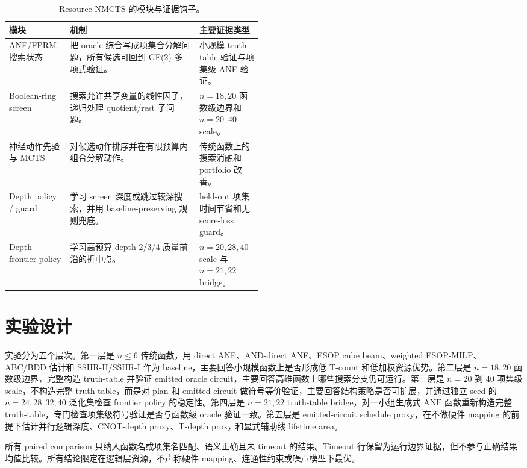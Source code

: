 \documentclass[UTF8,fontset=macnew,11pt]{ctexart}
\newcommand{\method}{Resource-NMCTS}
\newcommand{\anf}{\ensuremath{\mathrm{ANF}}}
\newcommand{\mcts}{\ensuremath{\mathrm{MCTS}}}
\newcommand{\ttable}{truth-table}
\begin{document}
\begin{table}[H]
\centering
\small
\caption{\method{} 的模块与证据钩子。}
\label{tab:modules}
\begin{tabularx}{\linewidth}{>{\raggedright\arraybackslash}p{0.24\linewidth}>{\raggedright\arraybackslash}X>{\raggedright\arraybackslash}p{0.25\linewidth}}
\toprule
模块 & 机制 & 主要证据类型 \\
\midrule
ANF/FPRM 搜索状态 & 把 oracle 综合写成项集合分解问题，所有候选可回到 GF(2) 多项式验证。 & 小规模 truth-table 验证与项集级 ANF 验证。 \\
Boolean-ring screen & 搜索允许共享变量的线性因子，递归处理 quotient/rest 子问题。 & $n=18,20$ 函数级边界和 $n=20$--$40$ scale。 \\
神经动作先验与 \mcts{} & 对候选动作排序并在有限预算内组合分解动作。 & 传统函数上的搜索消融和 portfolio 改善。 \\
Depth policy / guard & 学习 screen 深度或跳过较深搜索，并用 baseline-preserving 规则兜底。 & held-out 项集时间节省和无 score-loss guard。 \\
Depth-frontier policy & 学习高预算 depth-2/3/4 质量前沿的折中点。 & $n=20,28,40$ scale 与 $n=21,22$ bridge。 \\
\bottomrule
\end{tabularx}
\end{table}

\section{实验设计}

实验分为五个层次。第一层是 $n\leq6$ 传统函数，用 direct ANF、AND-direct ANF、ESOP cube beam、weighted ESOP-MILP、ABC/BDD 估计和 SSHR-H/SSHR-I 作为 baseline，主要回答小规模函数上是否形成低 T-count 和低加权资源优势。第二层是 $n=18,20$ 函数级边界，完整构造 \ttable{} 并验证 emitted oracle circuit，主要回答高维函数上哪些搜索分支仍可运行。第三层是 $n=20$ 到 $40$ 项集级 scale，不构造完整 \ttable{}，而是对 plan 和 emitted circuit 做符号等价验证，主要回答结构策略是否可扩展，并通过独立 seed 的 $n=24,28,32,40$ 泛化集检查 frontier policy 的稳定性。第四层是 $n=21,22$ truth-table bridge，对一小组生成式 \anf{} 函数重新构造完整 \ttable{}，专门检查项集级符号验证是否与函数级 oracle 验证一致。第五层是 emitted-circuit schedule proxy，在不做硬件 mapping 的前提下估计并行逻辑深度、CNOT-depth proxy、T-depth proxy 和显式辅助线 lifetime area。

所有 paired comparison 只纳入函数名或项集名匹配、语义正确且未 timeout 的结果。Timeout 行保留为运行边界证据，但不参与正确结果均值比较。所有结论限定在逻辑层资源，不声称硬件 mapping、连通性约束或噪声模型下最优。
\end{document}
